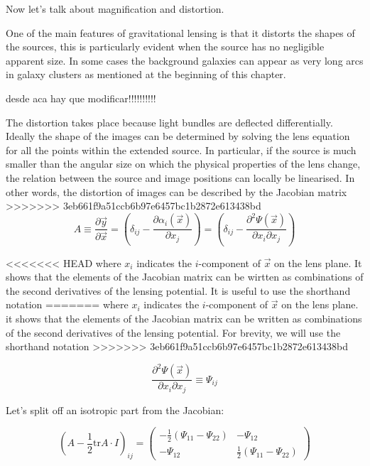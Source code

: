 Now let's talk about magnification and distortion.

One of the main features of gravitational lensing is that it distorts the shapes of the sources, this is particularly evident when the source has no negligible apparent size. In some cases the background galaxies can appear as very long arcs in galaxy clusters as mentioned at the beginning of this chapter. 

desde aca hay que modificar!!!!!!!!!!


The distortion takes place because light bundles are deflected differentially. Ideally the shape of the images can be determined by solving the lens equation for all the points within the extended source. In particular, if the source is much smaller than the angular size on which the physical properties of the lens change, the relation between the source and image positions can locally be linearised. In other words, the distortion of images can be described by the Jacobian matrix
>>>>>>> 3eb661f9a51ccb6b97e6457bc1b2872e613438bd
\begin{equation}
A\equiv\frac{\partial\vec{y}}{\partial\vec{x}}=\left(\delta_{ij}-\frac{\partial\alpha_{i}(\vec{x})}{\partial x_{j}}\right)=\left(\delta_{ij}-\frac{\partial^{2}\Psi(\vec{x})}{\partial x_{i}\partial x_{j}}\right)
\end{equation}

<<<<<<< HEAD
where $x_i$ indicates the $i$-component of $\vec{x}$ on the lens plane. It shows that the elements of the Jacobian matrix can be wirtten as combinations of the second derivatives of the lensing potential. It is useful to use the shorthand notation
=======
where $x_i$ indicates the $i$-component of $\vec{x}$ on the lens plane. it shows that the elements of the Jacobian matrix can be written as combinations of the second derivatives of the lensing potential. For brevity, we will use the shorthand notation
>>>>>>> 3eb661f9a51ccb6b97e6457bc1b2872e613438bd

\begin{equation}
\frac{\partial^{2}\Psi(\vec{x})}{\partial x_{i}\partial x_{j}}\equiv\Psi_{ij}
\end{equation}

Let's split off an isotropic part from the Jacobian:

\begin{equation}
\left(A-\frac{1}{2}\text{tr}A\cdot I\right)_{ij}=\left(\begin{array}{cc}
-\frac{1}{2}\left(\Psi_{11}-\Psi_{22}\right) & -\Psi_{12}\\
-\Psi_{12} & \frac{1}{2}\left(\Psi_{11}-\Psi_{22}\right)
\end{array}\right)
\end{equation}

